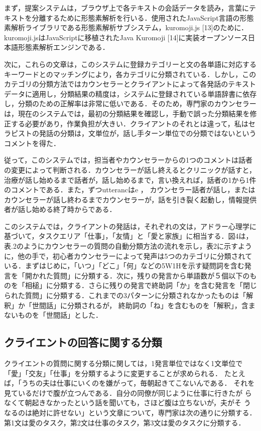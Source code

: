 \documentclass[shuuron]{kuee}
\begin{document}
まず，提案システムは，ブラウザ上で各テキストの会話データを読み，言葉にテキストを分離するために形態素解析を行いる．使用されたJavaScript言語の形態素解析ライブラリである形態素解析サブシステム，kuromoji.js [13]のために． kuromoji.jsはJavaScriptに移植されたJava Kuromoji [14]に実装オープンソース日本語形態素解析エンジンである．

  次に，これらの文章は，このシステムに登録カテゴリーと文の各単語に対応するキーワードとのマッチングにより，各カテゴリに分類されている．しかし，このカテゴリの分類方法ではカウンセラーとクライアントによって各発話のテキストデータに適用し，分類結果の精度は，システムに登録されている単語辞書に依存し，分類のための正解率は非常に低いである．そのため，専門家のカウンセラーは，現在のシステムでは，最初の分類結果を確認し，手動で誤った分類結果を修正する必要があり，作業負担が大きい．クライアントのそれとは違って，私はセラピストの発話の分類は，文単位が，話し手ターン単位での分類ではないというコメントを得た．


  従って，このシステムでは，担当者やカウンセラーからの1つのコメントは話者の変更によって判断される．カウンセラーが話し終えるとクリニックが話すと，治療が話し始めるまで話者が，話し始めるまで，言い換えれば，話者の1から1件のコメントである．また，ずつutterancはe  ， カウンセラー話者が話し，またはカウンセラーが話し終わるまでカウンセラーが，話を引き裂く起動し，情報提供者が話し始める終了時からである．

  このシステムでは，クライアントの発話は，それぞれの文は，アドラー心理学に基づいて，タスクエリア「仕事」，「友情」と「愛と家族」に相当する．図4は，表.2のようにカウンセラーの質問の自動分類方法の流れを示し，表2に示すように，他の手で，初心者カウンセラーによって発声は5つのカテゴリに分類されている．まずはじめに，「いつ」「どこ」「何」などの5W1Hを示す疑問詞を含む発言を「開かれた質問」に分類する．次に，残りの発言から単語数が５個以下のものを「相槌」に分類する．さらに残りの発言で終助詞「か」を含む発言を「閉じられた質問」に分類する．これまでの3パターンに分類されなかったものは「解釈」か「世間話」に分類されるが，
  終助詞の「ね」を含むものを「解釈」，含まないものを「世間話」とした．




\subsection{クライエントの回答に関する分類} %



クライエントの質問に関する分類に関しては，1発言単位ではなく1文単位で「愛」「交友」「仕事」を分類するように変更することが求められる．
たとえば，「うちの夫は仕事にいくのを嫌がって，毎朝起きてこないんである．
それを見ているだけで腹が立つんである．自分の同僚が同じように仕事に行きたが
らなくて朝起きなかったという話を聞いても，さほど腹は立ちないが，夫がそ
うなるのは絶対に許せない」という文章について，専門家は次の通りに分類する．第1文は愛のタスク，第2文は仕事のタスク，第3文は愛のタスクに分類する．
\end{document}
